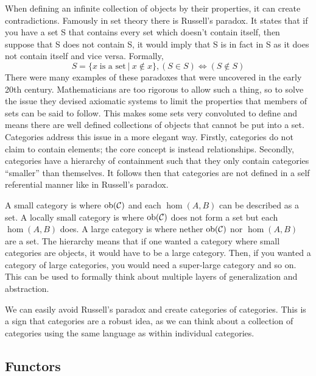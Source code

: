 \documentclass[10pt,a4paper,reqno]{amsart}
\numberwithin{figure}{section}
\begin{document}
When defining an infinite collection of objects by their properties, it can
create contradictions. Famously in set theory there is Russell's paradox\autocite{Russell:1903}. It
states that if you have a set S that contains every set which doesn't contain
itself, then suppose that S does not contain S, it would imply that S is in fact
in S as it does not contain itself and vice versa. Formally, 
\begin{equation}
S = \{x\;\text{is a set}\:|\:x\notin x\}, (S\in S) \iff (S\notin S)
\end{equation}
There were many examples of these paradoxes that were uncovered in the early
20th century. Mathematicians are too rigorous to allow such a thing, so to solve
the issue they devised axiomatic systems to limit the properties that members of
sets can be said to follow. This makes some sets very convoluted to define and
means there are well defined collections of objects that cannot be put into a
set. Categories address this issue in a more elegant way. Firstly, categories
do not claim to contain elements; the core concept is instead relationships.
Secondly, categories have a hierarchy of containment such that they only contain
categories ``smaller'' than themselves. It follows then that categories are not
defined in a self referential manner like in Russell's paradox.

A small category is where $\operatorname{ob}(\mathcal{C})$ and each $\hom(A,B)$ can be
described as a set. A locally small category is where $\operatorname{ob}(\mathcal{C})$
does not form a set but each $\hom(A,B)$ does. A large category is where nether
$\operatorname{ob}(\mathcal{C})$ nor $\hom(A,B)$ are a set. The hierarchy means that if one
wanted a category where small categories are objects, it would have to be a
large category. Then, if you wanted a category of large categories, you would
need a super-large category and so on. This can be used to formally think about
multiple layers of generalization and abstraction.

We can easily avoid Russell's paradox and create categories of categories. 
This is a sign that categories are a robust idea, as we can think about a collection of 
categories using the same language as within individual categories. 
\subsection{Functors}
\end{document}
